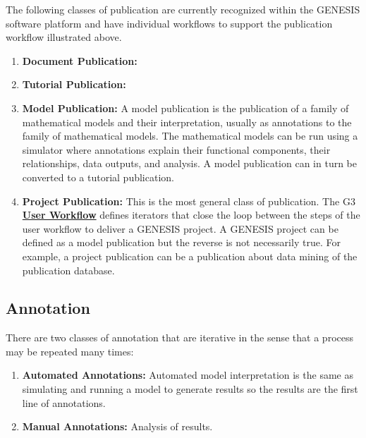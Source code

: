 \documentclass[12pt]{article}
\begin{document}
The following classes of publication are currently recognized within the GENESIS software platform and have individual workflows to support the publication workflow illustrated above.

\begin{enumerate}
   \item {\bf Document Publication:}
   \item {\bf Tutorial Publication:}
   \item {\bf Model Publication:} A model publication is the publication of a family of mathematical models and their interpretation, usually as annotations to the family of mathematical models. The mathematical models can be run using a simulator where annotations explain their functional components, their relationships, data outputs, and analysis. A model publication can in turn be converted to a tutorial publication.
   \item{\bf Project Publication:} This is the most general class of publication. The G3 \href{../workflow-user/eotkflow-user.tex}{\bf User Workflow} defines iterators that close the loop between the steps of the user workflow to deliver a GENESIS project. A GENESIS project can be defined as  a model publication but the reverse is not necessarily true. For example, a project publication can be a publication about data mining of the publication database.
\end{enumerate}

\subsection*{Annotation}

There are two classes of annotation that are iterative in the sense that a process may be repeated many times:

\begin{enumerate}
   \item {\bf Automated Annotations:} Automated model interpretation is the same as simulating and running a model to generate results so the results are the first line of annotations.
   \item {\bf Manual Annotations:} Analysis of results.
\end{enumerate}
\end{document}
